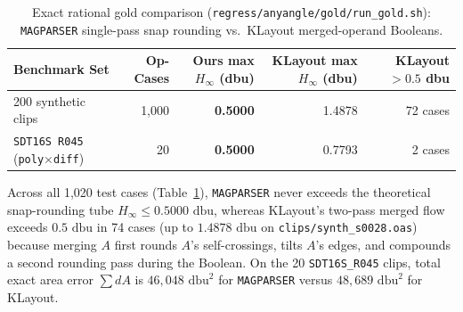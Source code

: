 \begin{table}[htbp]
\centering
\caption{Exact rational gold comparison (\texttt{regress/anyangle/gold/run\_gold.sh}): \texttt{MAGPARSER} single-pass snap rounding vs.\ KLayout merged-operand Booleans.}
\label{tab:gold_results}
\small
\begin{tabular}{@{}lrrrr@{}}
\toprule
\textbf{Benchmark Set} & \textbf{Op-Cases} & \textbf{Ours max $H_\infty$ (dbu)} & \textbf{KLayout max $H_\infty$ (dbu)} & \textbf{KLayout $> 0.5$ dbu} \\
\midrule
200 synthetic clips & 1,000 & \textbf{0.5000} & 1.4878 & 72 cases \\
\texttt{SDT16S R045} (\texttt{poly}$\times$\texttt{diff}) & 20 & \textbf{0.5000} & 0.7793 & 2 cases \\
\bottomrule
\end{tabular}
\end{table}

Across all 1,020 test cases (Table~\ref{tab:gold_results}), \texttt{MAGPARSER} never exceeds the theoretical snap-rounding tube $H_\infty \le 0.5000\text{ dbu}$, whereas KLayout's two-pass merged flow exceeds $0.5\text{ dbu}$ in 74 cases (up to $1.4878\text{ dbu}$ on \texttt{clips/synth\_s0028.oas}) because merging $A$ first rounds $A$'s self-crossings, tilts $A$'s edges, and compounds a second rounding pass during the Boolean. On the 20 \texttt{SDT16S\_R045} clips, total exact area error $\sum dA$ is $46{,}048\text{ dbu}^2$ for \texttt{MAGPARSER} versus $48{,}689\text{ dbu}^2$ for KLayout.
